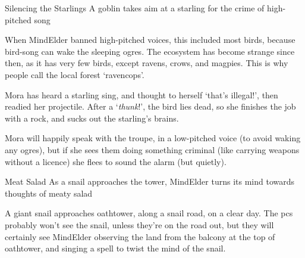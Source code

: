
{Silencing the Starlings}%
{A goblin takes aim at a starling for the crime of high-pitched song}%


\begin{exampletext}
  When \gls{MindElder} banned high-pitched voices, this included most birds, because bird-song can wake the sleeping \glspl{ogre}.
  The ecosystem has become strange since then, as it has very few birds, except ravens, crows, and magpies.
  This is why people call the local forest `\gls{ravencops}'.
\end{exampletext}

Mora has heard a starling sing, and thought to herself `that's illegal!', then readied her \gls{projectile}.
After a `\emph{thunk}!', the bird lies dead, so she finishes the job with a rock, and sucks out the starling's brains.

Mora will happily speak with the troupe, in a low-pitched voice (to avoid waking any \glspl{ogre}), but if she sees them doing something criminal (like carrying weapons without a licence) she flees to sound the alarm (but quietly).


{Meat Salad}%
{As a snail approaches the tower, \gls{MindElder} turns its mind towards thoughts of meaty salad}%


A giant snail approaches \gls{oathtower}, along a snail road, on a clear day.
The \glspl{pc} probably won't see the snail, unless they're on the road out, but they will certainly see \gls{MindElder} observing the land from the balcony at the top of \gls{oathtower}, and singing a spell to twist the mind of the snail.


